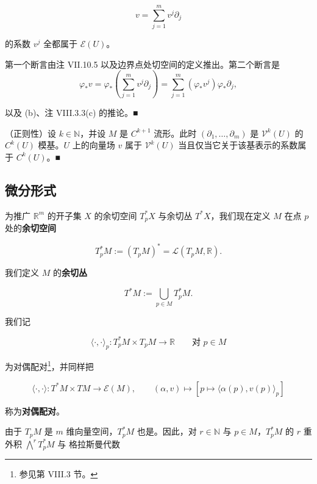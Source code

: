 \begin{remark}
\begin{items}
\[
v = \sum_{j=1}^{m} v^{j}\partial_{j}
\]

的系数 $ v^{j} $ 全都属于 $ \mathcal{E}(U) $。

\proofhead
第一个断言由注 VII.10.5 以及边界点处切空间的定义推出。第二个断言是
\[
\varphi_{\ast}v = \varphi_{\ast}\left(\sum_{j=1}^{m} v^{j}\partial_{j}\right) = \sum_{j=1}^{m}(\varphi_{\ast}v^{j})\varphi_{\ast}\partial_{j},
\]

以及 (b)、注 VIII.3.3(c) 的推论。\nobreak\hspace{0.35em}■

\item

（正则性）设 $ k \in \mathbb{N} $，并设 $ M $ 是 $ C^{k+1} $ 流形。此时 $ (\partial_{1},\ldots,\partial_{m}) $ 是 $ \mathcal{V}^{k}(U) $ 的 $ C^{k}(U) $ 模基。$ U $ 上的向量场 $ v $ 属于 $ \mathcal{V}^{k}(U) $ 当且仅当它关于该基表示的系数属于 $ C^{k}(U) $。\nobreak\hspace{0.35em}■

\end{items}

\end{remark}

\subsection*{微分形式}

为推广 $ \mathbb{R}^{m} $ 的开子集 $ X $ 的余切空间 $ T_{p}^{\ast}X $ 与余切丛 $ T^{\ast}X $，我们现在定义 $ M $ 在点 $ p $ 处的\textbf{余切空间}

\[
T_{p}^{\ast}M := (T_{p}M)^{\ast} = \mathcal{L}(T_{p}M,\mathbb{R}).
\]

我们定义 $ M $ 的\textbf{余切丛}

\[
T^{\ast}M := \bigcup_{p\in M} T_{p}^{\ast}M.
\]

我们记

\[
\langle\cdot,\cdot\rangle_{p} : T_{p}^{\ast}M\times T_{p}M\to\mathbb{R} \qquad \text{对 } p\in M
\]

为对偶配对\footnote{参见第 VIII.3 节。}，并同样把

\[
\langle\cdot,\cdot\rangle : T^{\ast}M\times TM\to\mathcal{E}(M), \qquad (\alpha,v)\mapsto[p\mapsto\langle\alpha(p),v(p)\rangle_{p}]
\]

称为\textbf{对偶配对}。

由于 $ T_{p}M $ 是 $ m $ 维向量空间，$ T_{p}^{\ast}M $ 也是。因此，对 $ r\in\mathbb{N} $ 与 $ p\in M $，$ T_{p}^{\ast}M $ 的 $ r $ 重外积 $ \bigwedge^{r}T_{p}^{\ast}M $ 与 格拉斯曼代数

